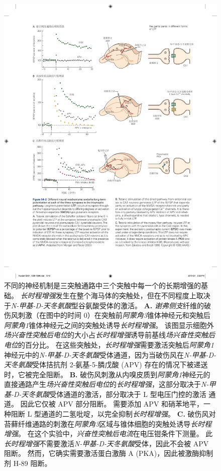 \begin{figure}[htbp]
	\centering
	\includegraphics[width=0.9\linewidth]{chap54/fig_54_2}
	\caption{不同的神经机制是三突触通路中三个突触中每一个的长期增强的基础。
		\textit{长时程增强}发生在整个海马体的突触处，但在不同程度上取决于\textit{N-甲基-D-天冬氨酸}型谷氨酸受体的激活。
		\textbf{A.} \textit{谢弗侧支}纤维的破伤风刺激（在图中的时间 0）在突触前\textit{阿蒙角3}锥体神经元和突触后\textit{阿蒙角1}锥体神经元之间的突触处诱导\textit{长时程增强}。
		该图显示细胞外\textit{场兴奋性突触后电位}的大小占\textit{长时程增强}诱导前基线\textit{场兴奋性突触后电位}的百分比。
		在这些突触处，\textit{长时程增强}需要激活突触后\textit{阿蒙角1}神经元中的\textit{N-甲基-D-天冬氨酸}受体通道，因为当破伤风在\textit{N-甲基-D-天冬氨酸}受体拮抗剂 2-氨基-5-膦戊酸 (APV) 存在的情况下被递送时，它被完全阻断\cite{morgan2001electrical}。
		\textbf{B.} 破伤风刺激从内嗅皮质到\textit{阿蒙角1}神经元的直接通路产生\textit{场兴奋性突触后电位}的\textit{长时程增强}，这部分取决于\textit{N-甲基-D-天冬氨酸}受体通道的激活，部分取决于 L 型电压门控的激活  通道。
		因此它仅被 APV 部分阻断。
		需要添加 APV 和硝苯地平，一种阻断 L 型通道的二氢吡啶，以完全抑制\textit{长时程增强}。
		\textbf{C.} 破伤风对苔藓纤维通路的刺激在\textit{阿蒙角3}区域与锥体细胞的突触处诱导\textit{长时程增强}。
		在这个实验中，\textit{兴奋性突触后电流}在电压钳条件下测量。
		此\textit{长时程增强}不需要激活\textit{N-甲基-D-天冬氨酸}受体，因此不会被 APV 阻断。
		然而，它确实需要激活蛋白激酶 A (PKA)，因此被激酶抑制剂 H-89 阻断\cite{zalutsky1990comparison}。}
	\label{fig:54_2}
\end{figure}


